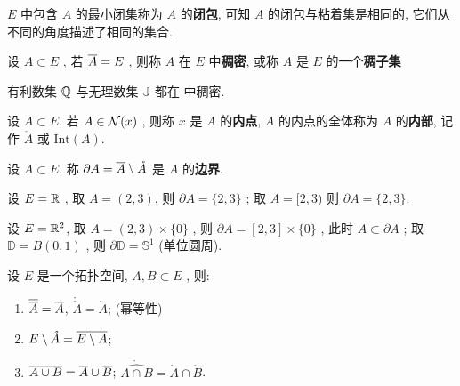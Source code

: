      \begin{Remark}
          $ E $ 中包含 $ A $ 的最小闭集称为 $ A $ 的\textbf{闭包}, 可知 $ A $ 的闭包与粘着集是相同的, 它们从不同的角度描述了相同的集合. 
     \end{Remark}
     \begin{Definition}[稠密]\label{def:稠密}
          设 $ A\subset E $ , 若 $ \baro{A}=E $ , 则称 $ A $ 在 $ E $ 中\textbf{稠密}, 或称 $ A $ 是 $ E $ 的一个\textbf{稠子集}
     \end{Definition}
     \begin{Example}
          有利数集 $ \Q $ 与无理数集 $ \mathbb{J} $ 都在 \R 中稠密. 
     \end{Example}
     \begin{Definition}[内部]\label{def:内部}
          设 $ A\subset E $, 若 $ A\in\CN(x) $ , 则称 $ x $ 是 $ A $ 的\textbf{内点},  $ A $ 的内点的全体称为 $ A $ 的\textbf{内部}, 记作 $ \mathring{A} $ 或 $ \mathrm{Int}(A) $.  
     \end{Definition}
     \begin{Definition}[边界]\label{def:边界}
          设 $ A\subset E $, 称 $ \partial A = \baro{A}\sm\mathring{A} $ 是 $ A $ 的\textbf{边界}.
     \end{Definition}
     \begin{Example}
          设 $ E=\R $ , 取 $ A = (2, 3) $, 则 $ \partial A = \{ 2, 3 \} $ ; 取 $ A = [2, 3) $ 则 $ \partial A = \{ 2, 3 \} $. 
          
          设 $ E = \R^{2} $, 取 $ A = (2, 3)\times \{0\} $ , 则 $ \partial A = [2, 3]\times \{0\} $ , 此时 $ A\subset \partial A $  ; 取 $ \mathbb{D}=B(0, 1) $ , 则 $ \partial \mathbb{D}=\mathbb{S}^{1} $ (单位圆周). 
     \end{Example}
     \begin{Theorem}\label{thm:闭包和内部的性质}
          设 $ E $ 是一个拓扑空间, $ A, B\subset E $ , 则:
          \begin{enumerate}[(1)]
               \item $ \baro{\baro{A}}=\baro{A} $, $ \mathring{\mathring{A}}=\mathring{A} $; (幂等性)
               \item $ E\sm\mathring{A}=\overline{E\sm A} $;
               \item \label{item:闭包内部}$ \overline {A\cup B}=\baro{A}\cup \baro{B} $; $ \mathring{\widehat{A\cap B}}=\mathring{A}\cap\mathring{B} $.   
          \end{enumerate}
     \end{Theorem}
